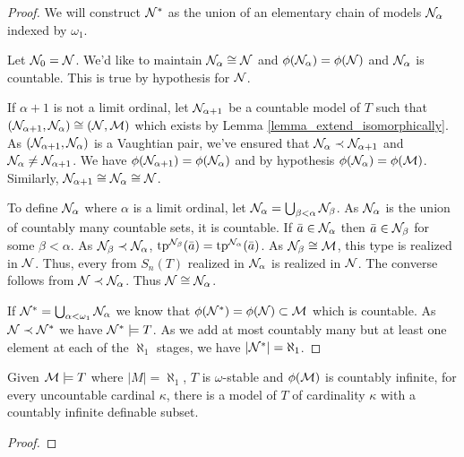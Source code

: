 \begin{proof}
We will construct \(\mathcal{N}^*\) as the union of an elementary chain of models \(\mathcal{N}_\alpha\) indexed by \(\omega_1\).

Let \(\mathcal{N}_0 = \mathcal{N}\). 
We'd like to maintain \(\mathcal{N}_\alpha \cong \mathcal{N}\) and \(\phi(\mathcal{N}_\alpha) = \phi(\mathcal{N})\) and \(\mathcal{N}_\alpha\) is countable. 
This is true by hypothesis for \(\mathcal{N}\).

If \(\alpha + 1\) is not a limit ordinal, let \(\mathcal{N}_{\alpha + 1}\) be a countable model of \(T\) such that \((\mathcal{N}_{\alpha+1}, \mathcal{N}_\alpha) \cong (\mathcal{N}, \mathcal{M})\) which exists by Lemma \ref{lemma_extend_isomorphically}. 
As \((\mathcal{N}_{\alpha+1}, \mathcal{N}_\alpha)\) is a Vaughtian pair, we've ensured that \(\mathcal{N}_\alpha \prec \mathcal{N}_{\alpha+1}\) and \(\mathcal{N}_\alpha \neq \mathcal{N}_{\alpha+1}\).
We have \(\phi(\mathcal{N}_{\alpha + 1}) = \phi(\mathcal{N}_\alpha)\) and by hypothesis \(\phi(\mathcal{N}_\alpha) = \phi(\mathcal{M})\). 
Similarly,  \(\mathcal{N}_{\alpha+1} \cong \mathcal{N}_\alpha \cong \mathcal{N}\). 

To define \(\mathcal{N}_\alpha\) where \(\alpha\) is a limit ordinal, let \(\mathcal{N}_\alpha = \bigcup_{\beta < \alpha}\mathcal{N}_\beta\). 
As \(\mathcal{N}_\alpha\) is the union of countably many countable sets, it is countable. 
If \(\bar{a} \in \mathcal{N}_\alpha\) then \(\bar{a} \in \mathcal{N}_\beta\) for some \(\beta < \alpha\). 
As \(\mathcal{N}_\beta \prec \mathcal{N}_\alpha\), \(\text{tp}^{\mathcal{N}_\beta}(\bar{a}) = \text{tp}^{\mathcal{N}_\alpha}(\bar{a})\). 
As \(\mathcal{N}_\beta \cong \mathcal{M}\), this type is realized in \(\mathcal{N}\).
Thus, every from \(S_n(T)\) realized in \(\mathcal{N}_\alpha\) is realized in \(\mathcal{N}\). 
The converse follows from \(\mathcal{N} \prec \mathcal{N}_\alpha\). 
Thus \(\mathcal{N} \cong \mathcal{N}_\alpha\).

If \(\mathcal{N}^* = \bigcup_{\alpha < \omega_1}\mathcal{N}_\alpha\) we know that \(\phi(\mathcal{N}^*) = \phi(\mathcal{N}) \subset \mathcal{M}\) which is countable.
As \(\mathcal{N} \prec \mathcal{N}^*\) we have \(\mathcal{N}^* \models T\).  
As we add at most countably many but at least one element at each of the \(\aleph_1\) stages, we have \(|\mathcal{N}^*| = \aleph_1\).
\end{proof}

\begin{theorem}\label{theorem_uncountable_vaughtian_pairs}
Given \(\mathcal{M} \models T\) where \(|M| = \aleph_1\), \(T\) is \(\omega\)-stable and \(\phi(\mathcal{M})\) is countably infinite, for every uncountable cardinal \(\kappa\), there is a model of \(T\) of cardinality \(\kappa\) with a countably infinite definable subset.  
\end{theorem}

\begin{proof}
\end{proof}

